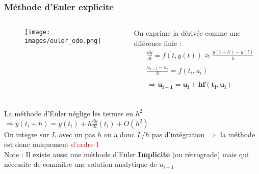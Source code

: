 \documentclass{beamer}
\begin{document}
\begin{frame}
\frametitle{Méthode d'Euler explicite}
\small
\begin{columns}[t]
\begin{column}{0.43\textwidth}
\begin{figure}
\texttt{[image: images/euler\_edo.png]}
\end{figure}
\end{column}
%
\begin{column}{0.5\textwidth}
On exprime la dérivée comme une dfférence finie :
\begin{align*}
& \frac{dy}{dt} = f(t,y(t)) \approx \frac{y(t+h) - y(t)}{h}\\
& \\
& \frac{u_{i+1} - u_i}{h} = f(t_i,u_i)\\
& \\
& \bm{\Rightarrow u_{i+1} = u_i + hf(t_i,u_i)} \\
\end{align*}
\end{column}
\end{columns}
La méthode d'Euler néglige les termes en $h^2$ $\Rightarrow y(t_i + h) = y(t_i) + h \frac{dy}{dt}(t_i) + O(h^2)$\\
On integre sur $L$ avec un pas $h$ on a donc $L/h$ pas d'intégration $\Rightarrow$ la méthode est donc uniquement \textcolor{red}{d'ordre 1}\\
\vspace{0.3cm}
\footnotesize{Note : Il existe aussi une méthode d'Euler \textbf{Implicite} (ou rétrograde) mais qui nécessite de connaitre une solution analytique de $u_{i+1}$}

\end{frame}
\end{document}
